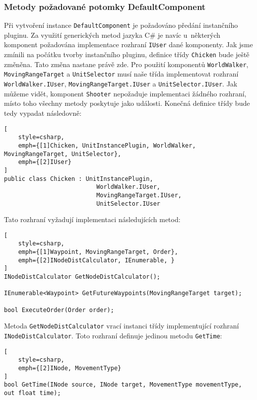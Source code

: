 \subsubsection{Metody požadované potomky DefaultComponent}
Při vytvoření instance \texttt{DefaultComponent} je požadováno předání instančního pluginu. Za využití generických metod jazyka C\# je navíc u~některých komponent požadována implementace rozhraní \texttt{IUser} dané komponenty. Jak jsme zmínili na počátku tvorby instančního pluginu, definice třídy \texttt{Chicken} bude ještě změněna. Tato změna nastane právě zde. Pro použití komponentů \texttt{WorldWalker}, \texttt{MovingRangeTarget} a \texttt{UnitSelector} musí naše třída implementovat rozhraní \texttt{WorldWalker.IUser}, \texttt{MovingRangeTarget.IUser} a \texttt{UnitSelector.IUser}. Jak můžeme vidět, komponent \texttt{Shooter} nepožaduje implementaci žádného rozhraní, místo toho všechny metody poskytuje jako události. Konečná definice třídy bude tedy vypadat následovně:

\begin{lstlisting}[
	style=csharp,
	emph={[1]Chicken, UnitInstancePlugin, WorldWalker, MovingRangeTarget, UnitSelector},
	emph={[2]IUser}
]
public class Chicken : UnitInstancePlugin, 
                          WorldWalker.IUser, 
                          MovingRangeTarget.IUser,
                          UnitSelector.IUser
\end{lstlisting}

Tato rozhraní vyžadují implementaci následujících metod:
\begin{lstlisting}[
	style=csharp,
	emph={[1]Waypoint, MovingRangeTarget, Order},
	emph={[2]INodeDistCalculator, IEnumerable, }
]
INodeDistCalculator GetNodeDistCalculator();

IEnumerable<Waypoint> GetFutureWaypoints(MovingRangeTarget target);

bool ExecuteOrder(Order order);
\end{lstlisting}

Metoda \texttt{GetNodeDistCalculator} vrací instanci třídy implementující rozhraní \texttt{INodeDistCalculator}. Toto rozhraní definuje jedinou metodu \texttt{GetTime}:

\begin{lstlisting}[
	style=csharp,
	emph={[2]INode, MovementType}
]
bool GetTime(INode source, INode target, MovementType movementType, out float time);
\end{lstlisting}

